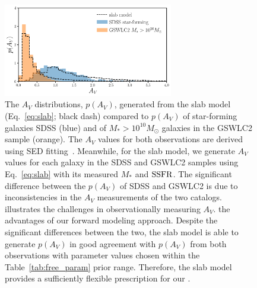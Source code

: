 \begin{figure}
    \begin{center}
        \includegraphics[width=0.66\textwidth]{figs/slab_model.pdf} 
        \caption{\label{fig:av_dist}
        The $A_V$ distributions, $p(A_V)$, generated from the slab model (Eq.~\ref{eq:slab};
        black dash) compared to $p(A_V)$ of star-forming galaxies  SDSS 
        (blue) and of $M_* > 10^{10}M_\odot$ galaxies in the  \cite{salim2018} GSWLC2 sample (orange). 
         The $A_V$ values for both observations are derived using SED
        fitting~\citep{brinchmann2004, salim2018}. 
        Meanwhile, for the slab model, we generate $A_V$ values for each galaxy
        in the SDSS and GSWLC2 samples using Eq.~\ref{eq:slab} with its
        measured $M_*$ and ${\rm SSFR}$. 
        The significant difference between the $p(A_V)$ of SDSS and GSWLC2 is
        due to  inconsistencies in the $A_V$ measurements of the two catalogs. 
         illustrates the challenges in observationally measuring $A_V$.
         the advantages of our forward modeling approach.
        Despite the significant differences between the two, the slab model is
        able to generate $p(A_V)$ in good agreement with $p(A_V)$ from both
        observations with parameter values chosen within the
        Table~\ref{tab:free_param} prior range. 
        Therefore, the slab model provides a sufficiently flexible prescription
        for our \eda.
        }
    \end{center}
\end{figure}


